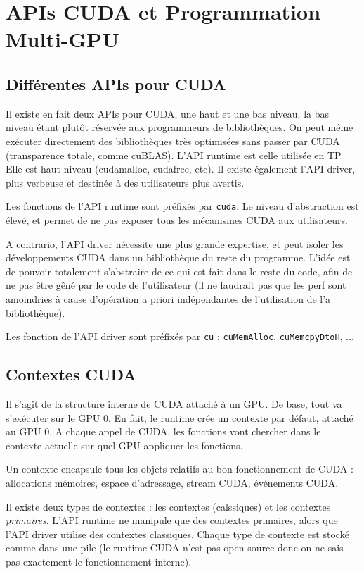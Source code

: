 \documentclass{article}
\begin{document}
\section{APIs CUDA et Programmation Multi-GPU}
\subsection{Différentes APIs pour CUDA}
Il existe en fait deux APIs pour CUDA, une haut et une bas niveau, la bas niveau étant plutôt réservée aux programmeurs de bibliothèques. On peut même exécuter directement des bibliothèques très optimisées sans passer par CUDA (transparence totale, comme cuBLAS). L'API runtime est celle utilisée en TP. Elle est haut niveau (cudamalloc, cudafree, etc). Il existe également l'API driver, plus verbeuse et destinée à des utilisateurs plus avertis.

Les fonctions de l'API runtime sont préfixés par \texttt{cuda}. Le niveau d'abstraction est élevé, et permet de ne pas exposer tous les mécanismes CUDA aux utilisateurs.

A contrario, l'API driver nécessite une plus grande expertise, et peut isoler les développements CUDA dans un bibliothèque du reste du programme. L'idée est de pouvoir totalement s'abstraire de ce qui est fait dans le reste du code, afin de ne pas être gêné par le code de l'utilisateur (il ne faudrait pas que les perf sont amoindries à cause d'opération a priori indépendantes de l'utilisation de l'a bibliothèque).

Les fonction de l'API driver sont préfixés par \texttt{cu} : \texttt{cuMemAlloc}, \texttt{cuMemcpyDtoH}, ...

\subsection{Contextes CUDA}
Il s'agit de la structure interne de CUDA attaché à un GPU. De base, tout va s'exécuter sur le GPU 0. En fait, le runtime crée un contexte par défaut, attaché au GPU 0. A chaque appel de CUDA, les fonctions vont chercher dans le contexte actuelle sur quel GPU appliquer les fonctions.

Un contexte encapsule tous les objets relatifs au bon fonctionnement de CUDA : allocations mémoires, espace d'adressage, stream CUDA, événements CUDA.

Il existe deux types de contextes : les contextes (calssiques) et les contextes \emph{primaires}. L'API runtime ne manipule que des contextes primaires, alors que l'API driver utilise des contextes classiques. Chaque type de contexte est stocké comme dans une pile (le runtime CUDA n'est pas open source donc on ne sais pas exactement le fonctionnement interne).
\end{document}
